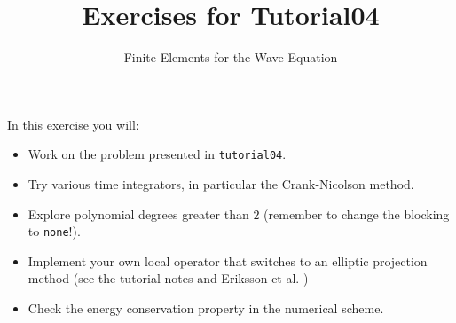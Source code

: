 \documentclass[12pt,a4paper]{article}
\title{\textbf{Exercises for Tutorial04}}
\subtitle{Finite Elements for the Wave  Equation}
\begin{document}
\exerciseheader

In this exercise you will:
\begin{itemize}
\item Work on the problem presented in \lstinline{tutorial04}.
\item Try various time integrators, in particular the Crank-Nicolson
  method.
\item Explore polynomial degrees greater than $2$ (remember to change the
  blocking to \lstinline{none}!).
\item Implement your own local operator that switches to an elliptic
  projection method (see the tutorial notes and Eriksson et
  al. \cite{Eriksson})
\item Check the energy conservation property in the numerical scheme.
\end{itemize}
\end{document}
